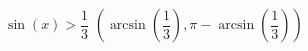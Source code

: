 { $\sin(x) > \dfrac{1}{3}$ }
{ $\left( \arcsin\left(\dfrac{1}{3}\right), \pi - \arcsin\left(\dfrac{1}{3}\right) \right)$}

